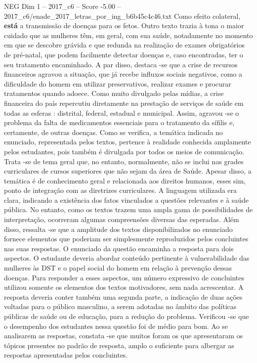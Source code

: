 \begin{textsample}{NEG Dim 1 – 2017\_c6 – Score -5.00 – 2017\_c6/enade\_2017\_letras\_por\_ing\_b6b45c4c46.txt}
Como efeito colateral, \textbf{está} a transmissão de doenças para os fetos.
Outro texto trazia à tona o maior cuidado que as mulheres têm, em geral, com sua saúde, notadamente no momento em que se descobre grávida e que redunda na realização de exames obrigatórios de pré-natal, que podem facilmente detectar doenças e, caso encontradas, ter o seu tratamento encaminhado.
A par disso, destaca -se que a crise de recursos financeiros agravou a situação, que já recebe influxos sociais negativos, como a dificuldade do homem em utilizar preservativos, realizar exames e procurar tratamentos quando adoece.
Como muito divulgado pelas mídias, a crise financeira do país repercutiu diretamente na prestação de serviços de saúde em todas as esferas : distrital, federal, estadual e municipal.
Assim, agravou -se o problema da falta de medicamentos essenciais para o tratamento da sífilis e, certamente, de outras doenças.
Como se verifica, a temática indicada no enunciado, representada pelos textos, pertence à realidade conhecida amplamente pelos estudantes, pois também é divulgada por todos os meios de comunicação.
Trata -se de tema geral que, no entanto, normalmente, não se inclui nas grades curriculares de cursos superiores que não sejam da área de Saúde.
Apesar disso, a temática é de conhecimento geral e relacionada aos direitos humanos, esses sim, ponto de integração com as diretrizes curriculares.
A linguagem utilizada era clara, indicando a existência dos fatos vinculados a questões relevantes e à saúde pública.
No entanto, como os textos trazem uma ampla gama de possibilidades de interpretação, ocorreram algumas compreensões diversas das esperadas.
Além disso, ressalta -se que a amplitude dos textos disponibilizados no enunciado fornece elementos que poderiam ser simplesmente reproduzidos pelos concluintes nas suas respostas.
O enunciado da questão encaminha a resposta para dois aspectos.
O estudante deveria abordar conteúdo pertinente à vulnerabilidade das mulheres às DST e o papel social do homem em relação à prevenção dessas doenças.
Para responder a esses aspectos, um número expressivo de concluintes utilizou somente os elementos dos textos motivadores, sem nada acrescentar.
A resposta deveria conter também uma segunda parte, a indicação de duas ações voltadas para o público masculino, a serem adotadas no âmbito das políticas públicas de saúde ou de educação, para a redução do problema.
Verificou -se que o desempenho dos estudantes nessa questão foi de médio para bom.
Ao se analisarem as respostas, constata -se que muitos foram os que apresentaram os tópicos presentes no padrão de resposta, amplo o suficiente para albergar as respostas apresentadas pelos concluintes.

\end{textsample}

